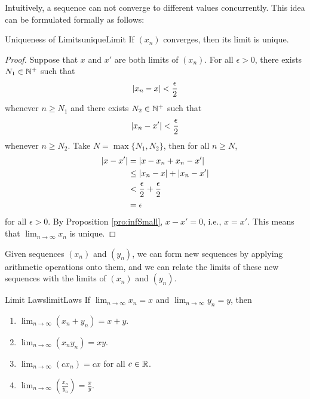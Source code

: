\documentclass[math]{amznotes}
\theoremstyle{remark}
\begin{document}
Intuitively, a sequence can not converge to different values concurrently. This idea can be formulated formally as follows:
\begin{thmbox}{Uniqueness of Limits}{uniqueLimit}
    If $(x_n)$ converges, then its limit is unique.
    \tcblower
    \begin{proof}
        Suppose that $x$ and $x'$ are both limits of $(x_n)$. For all $\epsilon > 0$, there exists $N_1 \in \mathbb{N}^+$ such that
        \begin{equation*}
            {\left\lvert {x_n - x} \right\rvert} < \frac{\epsilon}{2}
        \end{equation*}
        whenever $n \geq N_1$ and there exists $N_2 \in \mathbb{N}^+$ such that
        \begin{equation*}
            {\left\lvert {x_n - x'} \right\rvert} < \frac{\epsilon}{2}
        \end{equation*}
        whenever $n \geq N_2$. Take $N = \max\{N_1, N_2\}$, then for all $n \geq N$,
        \begin{align*}
            {\left\lvert {x - x'} \right\rvert} & = {\left\lvert {x - x_n + x_n - x'} \right\rvert} \\
            & \leq {\left\lvert {x_n - x} \right\rvert} + {\left\lvert {x_n - x'} \right\rvert} \\
            & < \frac{\epsilon}{2} + \frac{\epsilon}{2} \\
            & = \epsilon
        \end{align*}
        for all $\epsilon > 0$. By Proposition \ref{pro:infSmall}, $x - x' = 0$, i.e., $x = x'$. This means that $\lim_{n \to \infty}x_n$ is unique.
    \end{proof}
\end{thmbox}
Given sequences $(x_n)$ and $(y_n)$, we can form new sequences by applying arithmetic operations onto them, and we can relate the limits of these new sequences with the limits of $(x_n)$ and $(y_n)$.
\begin{thmbox}{Limit Laws}{limitLaws}
    If $\lim_{n \to \infty}x_n = x$ and $\lim_{n \to \infty}y_n = y$, then
    \begin{enumerate}
        \item $\lim_{n \to \infty}(x_n + y_n) = x + y$.
        \item $\lim_{n \to \infty}(x_ny_n) = xy$.
        \item $\lim_{n \to \infty}(cx_n) = cx$ for all $c \in \mathbb{R}$.
        \item $\lim_{n \to \infty}\left(\frac{x_n}{y_n}\right) = \frac{x}{y}$.
    \end{enumerate}
\end{thmbox}
\end{document}
